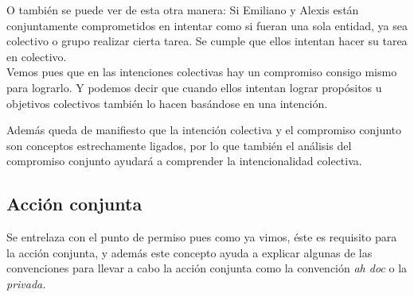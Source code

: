 \documentclass[oneside]{book}
\begin{document}
O también se puede ver de esta otra manera: Si Emiliano y Alexis están conjuntamente comprometidos en intentar como si fueran una sola entidad, ya sea colectivo o grupo realizar cierta tarea. Se cumple que ellos intentan hacer su tarea en colectivo.
\\

Vemos pues que en las intenciones colectivas hay un compromiso consigo mismo para lograrlo. Y podemos decir que cuando ellos intentan lograr propósitos u objetivos colectivos también lo hacen basándose en una intención. 



Además queda de manifiesto que la intención colectiva y el compromiso conjunto son conceptos estrechamente ligados, por lo que también el análisis del compromiso conjunto ayudará a comprender la intencionalidad colectiva.


\subsection{Acción conjunta}



Se entrelaza con el punto de permiso pues como ya vimos, éste es requisito para la acción conjunta, y además este concepto ayuda a explicar algunas de las convenciones para llevar a cabo la acción conjunta como la convención \textit{ah doc} o  la \textit{privada.} 
\end{document}
